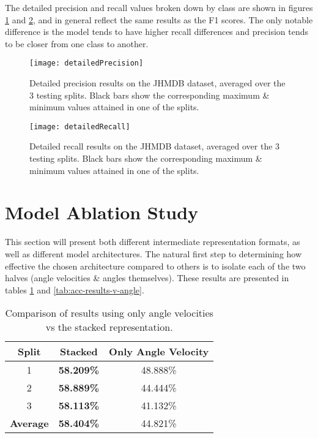 The detailed precision and recall values broken down by class are shown in figures \ref{fig:detailed-precision} and \ref{fig:detailed-recall}, and in general reflect the same results as the F1 scores. The only notable difference is the model tends to have higher recall differences and precision tends to be closer from one class to another.

\begin{figure}[ht]
	\texttt{[image: detailedPrecision]}
	\centering
	\caption{Detailed precision results on the JHMDB dataset, averaged over the 3 testing splits. Black bars show the corresponding maximum \& minimum values attained in one of the splits.}
	\label{fig:detailed-precision}
\end{figure}

\begin{figure}[ht]
	\texttt{[image: detailedRecall]}
	\centering
	\caption{Detailed recall results on the JHMDB dataset, averaged over the 3 testing splits. Black bars show the corresponding maximum \& minimum values attained in one of the splits.}
	\label{fig:detailed-recall}
\end{figure}

\section{Model Ablation Study}

This section will present both different intermediate representation formats, as well as different model architectures. The natural first step to determining how effective the chosen architecture compared to others is to isolate each of the two halves (angle velocities \& angles themselves). These results are presented in tables \ref{tab:acc-results-v-velocity} and \ref{tab:acc-results-v-angle}.

\begin{table}[ht]
	\centering
	\begin{tabular}{||c c c||} 
		\hline
		\textbf{Split} & \textbf{Stacked} & \textbf{Only Angle Velocity} \\ [0.5ex] 
		\hline\hline
		1 & \textbf{58.209\%} & 48.888\% \\ 
		\hline
		2 & \textbf{58.889\%} & 44.444\% \\
		\hline
		3 & \textbf{58.113\%} & 41.132\% \\
		\hline
		\hline
		\textbf{Average} & \textbf{58.404\%} & 44.821\% \\
		\hline
	\end{tabular}
	\caption{Comparison of results using only angle velocities vs the stacked representation.}
	\label{tab:acc-results-v-velocity}
\end{table}

